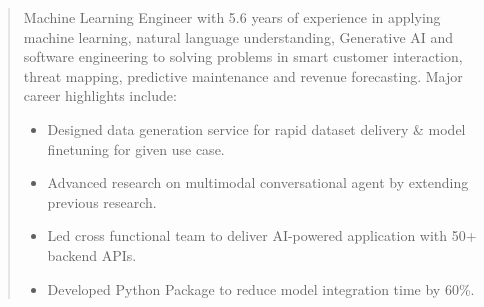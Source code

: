 \documentclass[10pt,a4paper,ragged2e,withhyper]{altacv}
\author{Madhusudan Kumar}
\date{\today}
\title{}
\begin{document}
\makecvheader
 \begin{quote}
 Machine Learning Engineer with 5.6 years of experience in applying machine learning, natural language understanding, Generative AI and software engineering to solving problems in smart customer interaction,   threat mapping, predictive maintenance and revenue forecasting. Major career highlights include:

\begin{itemize}
  \item Designed data generation service for rapid dataset delivery & model finetuning for given use case.
  \item Advanced research on multimodal conversational agent by extending previous research.
  \item Led cross functional team to deliver AI-powered application with 50+ backend APIs.
  \item Developed Python Package to reduce model integration time by 60\%.
\end{itemize}
\end{quote}
\label{sec:orge9bea09}

\par\divider\par
{}

\par
{}
\label{sec:org39499d9}

\end{document}
